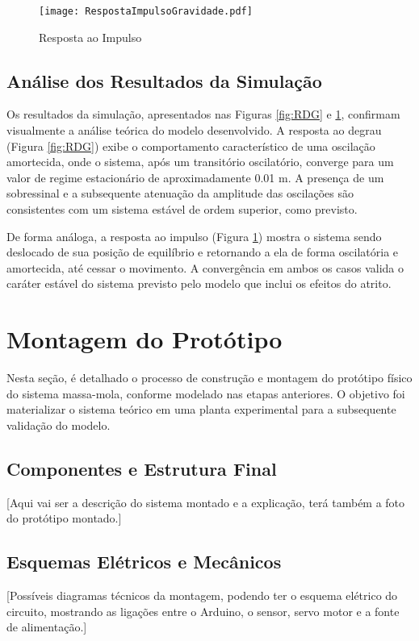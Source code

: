 \documentclass[9pt,a4paper,twocolumn,twoside]{tau-class/tau}
\begin{document}
\begin{figure}[H]
    \centering
    \texttt{[image: RespostaImpulsoGravidade.pdf]}
    \caption{Resposta ao Impulso}
    \label{fig:RIG}
\end{figure}


\subsection{Análise dos Resultados da Simulação}
Os resultados da simulação, apresentados nas Figuras \ref{fig:RDG} e \ref{fig:RIG}, confirmam visualmente a análise teórica do modelo desenvolvido. A resposta ao degrau (Figura \ref{fig:RDG}) exibe o comportamento característico de uma oscilação amortecida, onde o sistema, após um transitório oscilatório, converge para um valor de regime estacionário de aproximadamente 0.01 m. A presença de um sobressinal e a subsequente atenuação da amplitude das oscilações são consistentes com um sistema estável de ordem superior, como previsto.

De forma análoga, a resposta ao impulso (Figura \ref{fig:RIG}) mostra o sistema sendo deslocado de sua posição de equilíbrio e retornando a ela de forma oscilatória e amortecida, até cessar o movimento. A convergência em ambos os casos valida o caráter estável do sistema previsto pelo modelo que inclui os efeitos do atrito.

\section{Montagem do Protótipo}
Nesta seção, é detalhado o processo de construção e montagem do protótipo físico do sistema massa-mola, conforme modelado nas etapas anteriores. O objetivo foi materializar o sistema teórico em uma planta experimental para a subsequente validação do modelo.

\subsection{Componentes e Estrutura Final}
[Aqui vai ser a descrição do sistema montado e a explicação, terá também a foto do protótipo montado.]

\subsection{Esquemas Elétricos e Mecânicos}
[Possíveis diagramas técnicos da montagem, podendo ter o esquema elétrico do circuito, mostrando as ligações entre o Arduino, o sensor, servo motor e a fonte de alimentação.]
\end{document}
